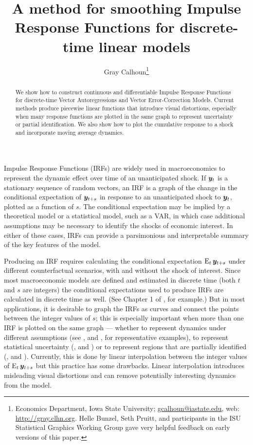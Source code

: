 \documentclass[AER,reviewmode]{tex/AEA}
\title{A method for smoothing Impulse Response Functions for
  discrete-time linear models}
\author{Gray Calhoun\thanks{%
    Economics Department, Iowa State University;
    \protect\url{gcalhoun@iastate.edu},
    web: \protect\url{http://gray.clhn.org}.
    Helle Bunzel, Seth Pruitt, and participants in the ISU Statistical
    Graphics Working Group gave very helpful feedback on early
    versions of this paper.}}
\begin{document}
\begin{abstract}\noindent%
  We show how to construct continuous and differentiable Impulse
  Response Functions for discrete-time Vector Autoregressions and
  Vector Error-Correction Models. Current methods produce piecewise
  linear functions that introduce visual distortions, especially when
  many response functions are plotted in the same graph to represent
  uncertainty or partial identification. We also show how to plot the
  cumulative response to a shock and incorporate moving average
  dynamics.
\end{abstract}

\maketitle

\noindent%
Impulse Response Functions (IRFs) are widely used in macroeconomics
to represent the dynamic effect over time of an unanticipated
shock. If $\bm{y}_t$ is a stationary sequence of random vectors, an IRF
is a graph of the change in the conditional expectation of $\bm{y}_{t+s}$
in response to an unanticipated shock to $\bm{y}_t$, plotted as a function
of $s$. The conditional expectation may be implied by a theoretical
model or a statistical model, such as a VAR, in which case additional
assumptions may be necessary to identify the shocks of economic
interest. In either of these cases, IRFs can provide a parsimonious and
interpretable summary of the key features of the model.

Producing an IRF requires calculating the conditional expectation
$\operatorname{E}_t \bm{y}_{t+s}$ under different counterfactual scenarios, with and
without the shock of interest. Since most macroeconomic models are
defined and estimated in discrete time (both $t$ and $s$ are integers)
the conditional expectations used to produce IRFs are calculated in
discrete time as well. (See Chapter 1 of \citealp{Ham:94}, for
example.) But in most applications, it is desirable to graph the IRFs
as curves and connect the points between the integer values of $s$;
this is especially important when more than one IRF is plotted on
the same graph --- whether to represent dynamics under different
assumptions (see \citealp{BeM:98}, and \citealp{StW:01}, for
representative examples), to represent statistical uncertainty
(\citealp{Kil:98}, and \citealp{SiZ:99}) or to represent regions that
are partially identified (\citealp{Uhl:05}, and
\citealp{InK:13}). Currently, this is done by linear interpolation
between the integer values of $\operatorname{E}_t \bm{y}_{t+s}$ but this practice has
some drawbacks. Linear interpolation introduces misleading visual
distortions and can remove potentially interesting dynamics from the
model.
\end{document}

